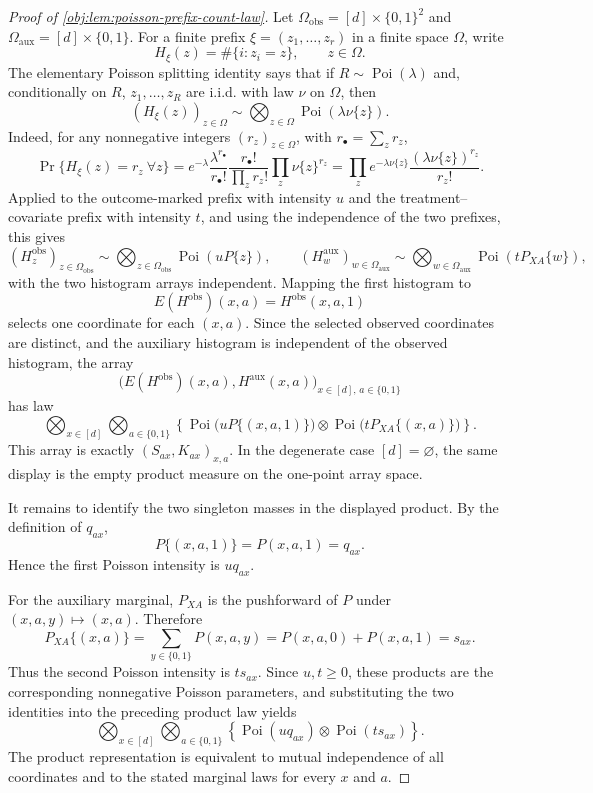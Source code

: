 \documentclass[11pt]{article}
\begin{document}
\begin{proof}[Proof of \cref{obj:lem:poisson-prefix-count-law}]
Let \(\Omega_{\mathrm{obs}}=[d]\times\{0,1\}^2\) and
\(\Omega_{\mathrm{aux}}=[d]\times\{0,1\}\).  For a finite prefix
\(\xi=(z_1,\ldots,z_r)\) in a finite space \(\Omega\), write
\[
H_\xi(z)=\#\{i:z_i=z\},\qquad z\in\Omega .
\]
The elementary Poisson splitting identity says that if \(R\sim\operatorname{Poi}(\lambda)\)
and, conditionally on \(R\), \(z_1,\ldots,z_R\) are i.i.d. with law \(\nu\) on
\(\Omega\), then
\[
(H_\xi(z))_{z\in\Omega}\sim \bigotimes_{z\in\Omega}\operatorname{Poi}(\lambda\nu\{z\}).
\]
Indeed, for any nonnegative integers \((r_z)_{z\in\Omega}\), with
\(r_\bullet=\sum_z r_z\),
\[
\Pr\{H_\xi(z)=r_z\ \forall z\}
=e^{-\lambda}\frac{\lambda^{r_\bullet}}{r_\bullet!}
\frac{r_\bullet!}{\prod_z r_z!}\prod_z \nu\{z\}^{r_z}
=\prod_z e^{-\lambda\nu\{z\}}\frac{(\lambda\nu\{z\})^{r_z}}{r_z!}.
\]
Applied to the outcome-marked prefix with intensity \(u\) and the treatment--covariate
prefix with intensity \(t\), and using the independence of the two prefixes, this gives
\[
(H^{\mathrm{obs}}_z)_{z\in\Omega_{\mathrm{obs}}}
\sim
\bigotimes_{z\in\Omega_{\mathrm{obs}}}\operatorname{Poi}(uP\{z\}),
\qquad
(H^{\mathrm{aux}}_w)_{w\in\Omega_{\mathrm{aux}}}
\sim
\bigotimes_{w\in\Omega_{\mathrm{aux}}}\operatorname{Poi}(tP_{XA}\{w\}),
\]
with the two histogram arrays independent.  Mapping the first histogram to
\[
E(H^{\mathrm{obs}})(x,a)=H^{\mathrm{obs}}(x,a,1)
\]
selects one coordinate for each \((x,a)\).  Since the selected observed coordinates are
distinct, and the auxiliary histogram is independent of the observed histogram, the
array
\[
\bigl(E(H^{\mathrm{obs}})(x,a),H^{\mathrm{aux}}(x,a)\bigr)_{x\in[d],\,a\in\{0,1\}}
\]
has law
\[
\bigotimes_{x\in[d]}\bigotimes_{a\in\{0,1\}}
\left\{\operatorname{Poi}\bigl(uP\{(x,a,1)\}\bigr)
\otimes
\operatorname{Poi}\bigl(tP_{XA}\{(x,a)\}\bigr)\right\}.
\]
This array is exactly \((S_{ax},K_{ax})_{x,a}\).  In the degenerate case
\([d]=\varnothing\), the same display is the empty product measure on the one-point
array space. %

It remains to identify the two singleton masses in the displayed product.  By the
definition of \(q_{ax}\),
\[
P\{(x,a,1)\}=P(x,a,1)=q_{ax}.
\]
Hence the first Poisson intensity is \(u q_{ax}\). %

For the auxiliary marginal, \(P_{XA}\) is the pushforward of \(P\) under
\((x,a,y)\mapsto(x,a)\).  Therefore
\[
P_{XA}\{(x,a)\}
=\sum_{y\in\{0,1\}}P(x,a,y)
=P(x,a,0)+P(x,a,1)
=s_{ax}.
\]
Thus the second Poisson intensity is \(t s_{ax}\).  Since \(u,t\ge0\), these products
are the corresponding nonnegative Poisson parameters, and substituting the two
identities into the preceding product law yields
\[
\bigotimes_{x\in[d]}\bigotimes_{a\in\{0,1\}}
\left\{\operatorname{Poi}(u q_{ax})\otimes
\operatorname{Poi}(t s_{ax})\right\}.
\]
The product representation is equivalent to mutual independence of all coordinates
and to the stated marginal laws for every \(x\) and \(a\). %
\end{proof}
\end{document}
